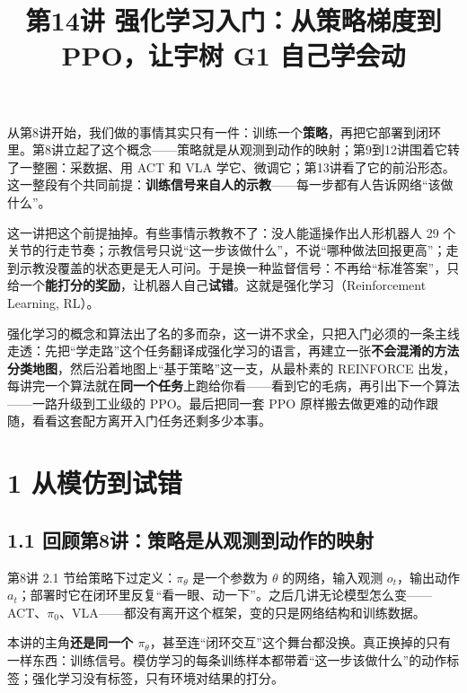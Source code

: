 \documentclass[
  chinese,
]{ctexart}
\title{第14讲 强化学习入门：从策略梯度到 PPO，让宇树 G1 自己学会动}
\author{}
\date{}
\renewcommand*\contentsname{目录}
\newcommand\contentsname{目录}
\begin{document}
\maketitle

\renewcommand*\contentsname{目录}
{
\hypersetup{linkcolor=}
\setcounter{tocdepth}{3}
\tableofcontents
}

从第8讲开始，我们做的事情其实只有一件：训练一个\textbf{策略}，再把它部署到闭环里。第8讲立起了这个概念------策略就是从观测到动作的映射；第9到12讲围着它转了一整圈：采数据、用
ACT 和 VLA
学它、微调它；第13讲看了它的前沿形态。这一整段有个共同前提：\textbf{训练信号来自人的示教}------每一步都有人告诉网络``该做什么''。

这一讲把这个前提抽掉。有些事情示教教不了：没人能遥操作出人形机器人 29
个关节的行走节奏；示教信号只说``这一步该做什么''，不说``哪种做法回报更高''；走到示教没覆盖的状态更是无人可问。于是换一种监督信号：不再给``标准答案''，只给一个\textbf{能打分的奖励}，让机器人自己\textbf{试错}。这就是强化学习（Reinforcement
Learning, RL）。

强化学习的概念和算法出了名的多而杂，这一讲不求全，只把入门必须的一条主线走透：先把``学走路''这个任务翻译成强化学习的语言，再建立一张\textbf{不会混淆的方法分类地图}，然后沿着地图上``基于策略''这一支，从最朴素的
REINFORCE
出发，每讲完一个算法就在\textbf{同一个任务}上跑给你看------看到它的毛病，再引出下一个算法------一路升级到工业级的
PPO。最后把同一套 PPO
原样搬去做更难的动作跟随，看看这套配方离开入门任务还剩多少本事。

\section{1 从模仿到试错}\label{ux4eceux6a21ux4effux5230ux8bd5ux9519}

\subsection{1.1
回顾第8讲：策略是从观测到动作的映射}\label{ux56deux987eux7b2c8ux8bb2ux7b56ux7565ux662fux4eceux89c2ux6d4bux5230ux52a8ux4f5cux7684ux6620ux5c04}

第8讲 2.1 节给策略下过定义：\(\pi_\theta\) 是一个参数为 \(\theta\)
的网络，输入观测 \(o_t\)，输出动作
\(a_t\)；部署时它在闭环里反复``看一眼、动一下''。之后几讲无论模型怎么变------ACT、\(\pi_0\)、VLA------都没有离开这个框架，变的只是网络结构和训练数据。

本讲的主角\textbf{还是同一个
\(\pi_\theta\)}，甚至连``闭环交互''这个舞台都没换。真正换掉的只有一样东西：训练信号。模仿学习的每条训练样本都带着``这一步该做什么''的动作标签；强化学习没有标签，只有环境对结果的打分。
\end{document}
